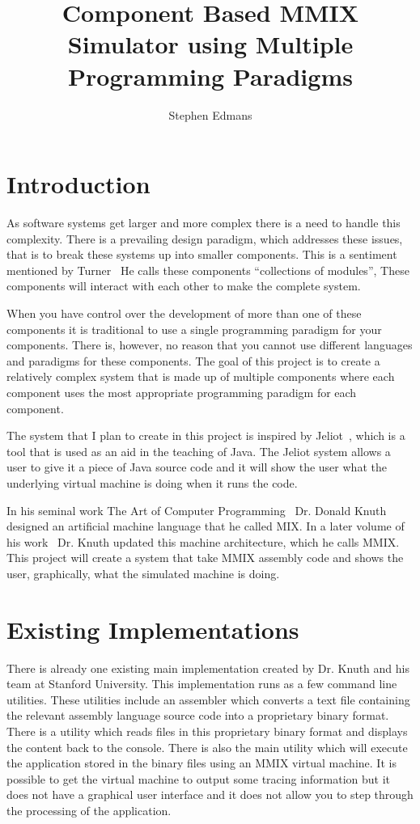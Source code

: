 \documentclass[11pt]{article} %
\title{Component Based MMIX Simulator using Multiple Programming Paradigms}
\author{Stephen Edmans}
\date{} %
\begin{document}
\maketitle
\newpage
\tableofcontents
\newpage
\listoffigures
\newpage
\section{Introduction}
As software systems get larger and more complex there is a need to handle this complexity. There is a prevailing design paradigm, which addresses these issues, that is to break these systems up into smaller components.  This is a sentiment mentioned by Turner~\cite{turner:why}  He calls these components ``collections of modules'', These components will interact with each other to make the complete system. 

When you have control over the development of more than one of these components it is traditional to use a single programming paradigm for your components. There is, however, no reason that you cannot use different languages and paradigms for these components. The goal of this project is to create a relatively complex system that is made up of multiple components where each component uses the most appropriate programming paradigm for each component.

The system that I plan to create in this project is inspired by Jeliot~\cite{jeliot:ref}, which is a tool that is used as an aid in the teaching of Java. The Jeliot system allows a user to give it a piece of Java source code and it will show the user what the underlying virtual machine is doing when it runs the code.

In his seminal work The Art of Computer Programming~\cite{knuth:aocp1} Dr. Donald Knuth designed an artificial machine language that he called MIX. In a later volume of his work~\cite{knuth:aocp2} Dr. Knuth updated this machine architecture, which he calls MMIX. This project will create a system that take MMIX assembly code and shows the user, graphically, what the simulated machine is doing.


\section{Existing Implementations}

There is already one existing main implementation created by Dr. Knuth and his team at Stanford University. This implementation runs as a few command line utilities.  These utilities include an assembler which converts a text file containing the relevant assembly language source code into a proprietary binary format.  There is a utility which reads files in this proprietary binary format and displays the content back to the console.  There is also the main utility which will execute the application stored in the binary files using an MMIX virtual machine.  It is possible to get the virtual machine to output some tracing information but it does not have a graphical user interface and it does not allow you to step through the processing of the application.  
\end{document}
